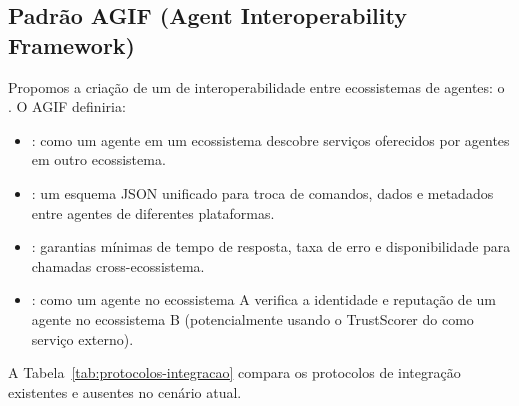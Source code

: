 \subsection{Padrão AGIF (Agent Interoperability Framework)}

Propomos a criação de um  de interoperabilidade
entre ecossistemas de agentes: o . O AGIF definiria:

\begin{itemize}
    \item {}: como um agente em um
    ecossistema descobre serviços oferecidos por agentes em outro
    ecossistema.
    \item {}: um esquema JSON unificado
    para troca de comandos, dados e metadados entre agentes de
    diferentes plataformas.
    \item {}: garantias
    mínimas de tempo de resposta, taxa de erro e disponibilidade
    para chamadas cross-ecossistema.
    \item {}: como um agente no
    ecossistema A verifica a identidade e reputação de um agente
    no ecossistema B (potencialmente usando o TrustScorer do
    \opencodeeco{} como serviço externo).
\end{itemize}

A Tabela~\ref{tab:protocolos-integracao} compara os protocolos de
integração existentes e ausentes no cenário atual.

\begin{table}[htb]
\centering
    \small
\caption{Protocolos de integração: existentes e ausentes}
\label{tab:protocolos-integracao}
\end{table}

